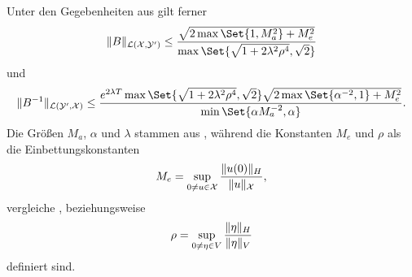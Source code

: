 \begin{Korollar}
\label{thm:schwab09:theorem51:ungleichungen}
    Unter den Gegebenheiten aus  gilt ferner
    \begin{equation}
        \label{eq:var_all_norm_B}
        \norm{B}_{\mathcal L(\mathcal X, \mathcal Y')} \leq \frac{\sqrt{2\max\Set{1, M_{a}^{2}} + M_{e}^{2}}}{\max\Set{\sqrt{1 + 2 \lambda^{2} \rho^{4}}, \sqrt{2}}}
    \end{equation}
    und
    \begin{equation}
        \label{eq:var_all_norm_B_inv}
        \norm{B^{-1}}_{\mathcal L(\mathcal Y', \mathcal X)} \leq \frac{e^{2 \lambda T} \max\Set{\sqrt{1 + 2 \lambda^{2} \rho^{4}}, \sqrt{2}} \sqrt{2 \max\Set{ \alpha^{-2}, 1} + M_{e}^{2}}}{\min\Set{\alpha M_{a}^{-2}, \alpha}}.
    \end{equation}
    Die Größen $M_{a}$, $\alpha$ und $\lambda$ stammen aus ,
    während die Konstanten $M_{e}$ und $\rho$ als die Einbettungskonstanten
    \begin{equation}
        \label{eq:var_all_M_e}
        M_{e} = \sup_{0 \neq u \in \mathcal X} \frac{\lVert u(0)\rVert_{H}}{\lVert u\rVert_{\mathcal X}},
    \end{equation}
    vergleiche , beziehungsweise
    \begin{equation}
        \label{eq:var_all_rho}
        \rho = \sup_{0 \neq \eta \in V} \frac{\lVert\eta\rVert_{H}}{\lVert\eta\rVert_{V}}
    \end{equation}
    definiert sind.
\end{Korollar}





